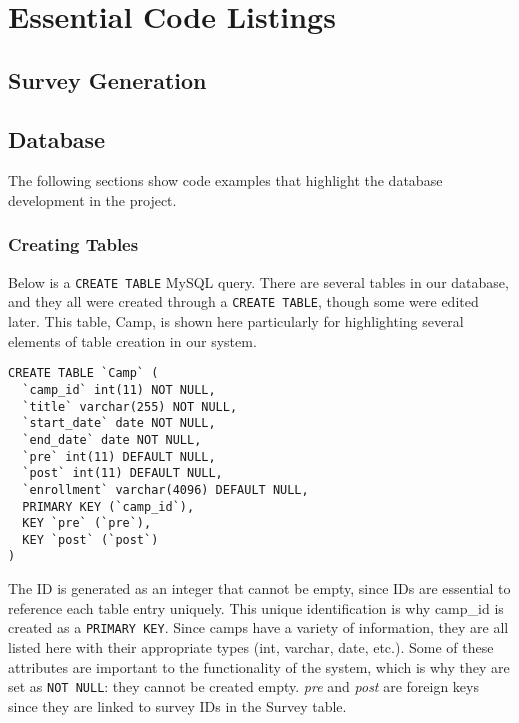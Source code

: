 \documentclass[../final.tex]{subfiles}
\begin{document}
\section{Essential Code Listings}
\subsection{Survey Generation}
\subsection{Database}
The following sections show code examples that highlight the database development in the project.
\subsubsection{Creating Tables}
Below is a \texttt{CREATE TABLE} MySQL query.
There are several tables in our database, and they all were created through a \texttt{CREATE TABLE}, though some were edited later.
This table, Camp, is shown here particularly for highlighting several elements of table creation in our system.
\begin{lstlisting}
CREATE TABLE `Camp` (
  `camp_id` int(11) NOT NULL,
  `title` varchar(255) NOT NULL,
  `start_date` date NOT NULL,
  `end_date` date NOT NULL,
  `pre` int(11) DEFAULT NULL,
  `post` int(11) DEFAULT NULL,
  `enrollment` varchar(4096) DEFAULT NULL,
  PRIMARY KEY (`camp_id`),
  KEY `pre` (`pre`),
  KEY `post` (`post`)
) 
\end{lstlisting}
The ID is generated as an integer that cannot be empty, since IDs are essential to reference each table entry uniquely.
This unique identification is why camp\_id is created as a \texttt{PRIMARY KEY}.
Since camps have a variety of information, they are all listed here with their appropriate types (int, varchar, date, etc.).
Some of these attributes are important to the functionality of the system, which is why they are set as \texttt{NOT NULL}: they cannot be created empty.
\emph{pre} and \emph{post} are foreign keys since they are linked to survey IDs in the Survey table.
\end{document}
